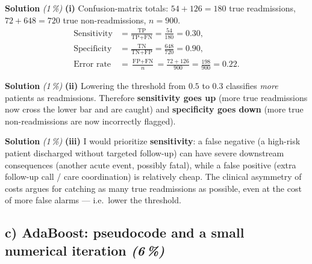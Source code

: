 \documentclass[11pt,a4paper]{article}
\newcommand{\subpoints}[1]{\textit{(#1\,\%)}}
\newcommand{\sol}{\noindent\textbf{Solution}}
\begin{document}
\sol{} \subpoints{1} \textbf{(i)} Confusion-matrix totals: $54+126 = 180$ true readmissions,
$72+648 = 720$ true non-readmissions, $n = 900$.
\begin{align*}
\text{Sensitivity} &= \frac{\text{TP}}{\text{TP}+\text{FN}} = \frac{54}{180} = \boxed{0.30}, \\
\text{Specificity} &= \frac{\text{TN}}{\text{TN}+\text{FP}} = \frac{648}{720} = \boxed{0.90}, \\
\text{Error rate} &= \frac{\text{FP}+\text{FN}}{n} = \frac{72+126}{900} = \frac{198}{900} = \boxed{0.22}.
\end{align*}

\medskip
\sol{} \subpoints{1} \textbf{(ii)} Lowering the threshold from $0.5$ to $0.3$ classifies
\emph{more} patients as readmissions. Therefore \textbf{sensitivity goes up} (more true
readmissions now cross the lower bar and are caught) and \textbf{specificity goes down} (more
true non-readmissions are now incorrectly flagged).

\medskip
\sol{} \subpoints{1} \textbf{(iii)} I would prioritize \textbf{sensitivity}: a false negative (a
high-risk patient discharged without targeted follow-up) can have severe downstream consequences
(another acute event, possibly fatal), while a false positive (extra follow-up call / care
coordination) is relatively cheap. The clinical asymmetry of costs argues for catching as many
true readmissions as possible, even at the cost of more false alarms --- i.e.\ lower the
threshold.

\subsection*{c) AdaBoost: pseudocode and a small numerical iteration \subpoints{6}}
\end{document}
